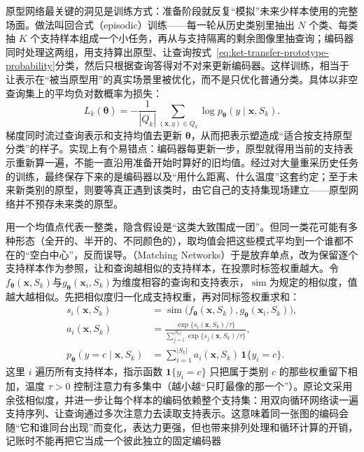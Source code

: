 原型网络最关键的洞见是训练方式：准备阶段就反复“模拟”未来少样本使用的完整场面。做法叫回合式（episodic）训练——每一轮从历史类别里抽出 $N$ 个类、每类抽 $K$ 个支持样本组成一个小任务，再从与支持隔离的剩余图像里抽查询；编码器同时处理这两组，用支持算出原型、让查询按式~\eqref{eq:ket-transfer-prototype-probability}分类，然后只根据查询答得对不对来更新编码器。这样训练，相当于让表示在“被当原型用”的真实场景里被优化，而不是只优化普通分类。具体以非空查询集上的平均负对数概率为损失：
\begin{equation}
  L_k(\bm{\theta})
  =-\frac{1}{|Q_k|}\sum_{(\bm x,y)\in Q_k}
  \log p_{\bm{\theta}}(y\mid\bm x,S_k).
  \label{eq:ket-transfer-episodic-loss}
\end{equation}
梯度同时流过查询表示和支持均值去更新 $\bm\theta$，从而把表示塑造成“适合按支持原型分类”的样子。实现上有个易错点：编码器每更新一步，原型就得用当前的支持表示重新算一遍，不能一直沿用准备开始时算好的旧均值。经过对大量重采历史任务的训练，最终保存下来的是编码器以及“用什么距离、什么温度”这套约定；至于未来新类别的原型，则要等真正遇到该类时，由它自己的支持集现场建立——原型网络并不预存未来类的原型。

用一个均值点代表一整类，隐含假设是“这类大致围成一团”。但同一类花可能有多种形态（全开的、半开的、不同颜色的），取均值会把这些模式平均到一个谁都不在的“空白中心”，反而误导。（Matching Networks）于是放弃单点，改为保留逐个支持样本作为参照，让和查询越相似的支持样本，在投票时标签权重越大。令$f_{\bm\theta}(\bm x,S_k)$与$g_{\bm\theta}(\bm x_i,S_k)$为维度相容的查询和支持表示，$\operatorname{sim}$为规定的相似度，值越大越相似。先把相似度归一化成支持权重，再对同标签权重求和：
\begin{align}
  s_i(\bm x,S_k)
  &=\operatorname{sim}\bigl(f_{\bm{\theta}}(\bm x,S_k),
       g_{\bm{\theta}}(\bm x_i,S_k)\bigr), \nonumber\\
  a_i(\bm x,S_k)
  &=\frac{\exp\{s_i(\bm x,S_k)/\tau\}}
  {\sum_{j=1}^{|S_k|}\exp\{s_j(\bm x,S_k)/\tau\}}, \nonumber\\
  p_{\bm{\theta}}(y=c\mid\bm x,S_k)
  &=\sum_{i=1}^{|S_k|}a_i(\bm x,S_k)\,\mathbf 1\{y_i=c\}.
  \label{eq:ket-transfer-matching}
\end{align}
这里 $i$ 遍历所有支持样本，指示函数 $\mathbf1\{y_i=c\}$ 只把属于类别 $c$ 的那些权重留下相加，温度 $\tau>0$ 控制注意力有多集中（越小越“只盯最像的那一个”）。原论文采用余弦相似度，并进一步让每个样本的编码依赖整个支持集：用双向循环网络读一遍支持序列、让查询通过多次注意力去读取支持表示。这意味着同一张图的编码会随“它和谁同台出现”而变化，表达力更强，但也带来排列处理和循环计算的开销，记账时不能再把它当成一个彼此独立的固定编码器

